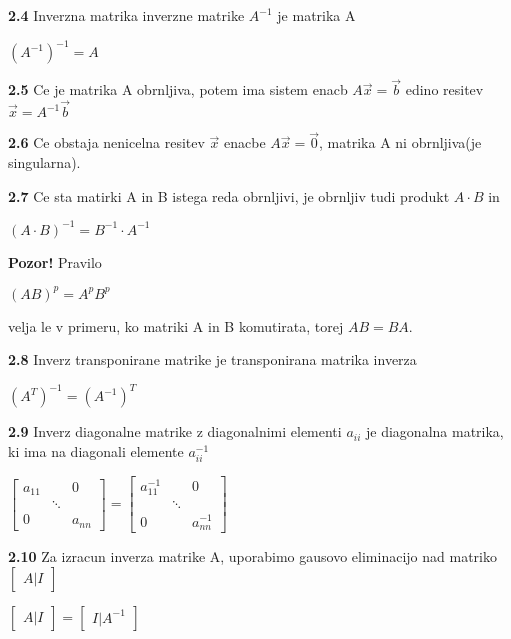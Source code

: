 \documentclass{article}
\begin{document}
\begin{multicols}{2}
	\textbf{2.4} Inverzna matrika inverzne matrike $A^{-1}$ je matrika A
	\begin{center}
		$(A^{-1})^{-1} = A$
	\end{center}

	\textbf{2.5} Ce je matrika A obrnljiva, potem ima sistem enacb
	$A\vec{x} = \vec{b}$ edino resitev $\vec{x} = A^{-1} \vec{b}$

	\textbf{2.6} Ce obstaja nenicelna resitev $\vec{x}$ enacbe $A\vec{x} = \vec{0}$,
	matrika A ni obrnljiva(je singularna).

	\textbf{2.7} Ce sta matirki A in B istega reda obrnljivi, je obrnljiv tudi
	produkt $A \cdot B$ in
	\begin{center}
		$(A \cdot B)^{-1} =
			B^{-1} \cdot A^{-1}
		$
	\end{center}

	\textbf{Pozor!} Pravilo
	\begin{center}
		$(AB)^{p} = A^{p}B^{p}$
	\end{center}
	velja le v primeru, ko matriki A in B komutirata, torej $AB = BA$.

	\textbf{2.8} Inverz transponirane matrike je transponirana matrika inverza
	\begin{center}
		$(A^{T})^{-1} = (A^{-1})^{T}$
	\end{center}

	\textbf{2.9} Inverz diagonalne matrike z diagonalnimi elementi $a_{ii}$ je
	diagonalna matrika, ki ima na diagonali elemente $a_{ii}^{-1}$
	\begin{center}
		$\begin{bmatrix}
				a_{11} &        & 0      \\
				       & \ddots &        \\
				0      &        & a_{nn}
			\end{bmatrix}=
			\begin{bmatrix}
				a_{11}^{-1} &        & 0           \\
				            & \ddots &             \\
				0           &        & a_{nn}^{-1}
			\end{bmatrix}
		$
	\end{center}

	\textbf{2.10} Za izracun inverza matrike A, uporabimo gausovo eliminacijo nad
	matriko $\begin{bmatrix}A|I\end{bmatrix}$
	\begin{center}
		$\begin{bmatrix}A|I\end{bmatrix} =
			\begin{bmatrix}I|A^{-1}\end{bmatrix}
		$
	\end{center}


\end{multicols}
\end{document}
